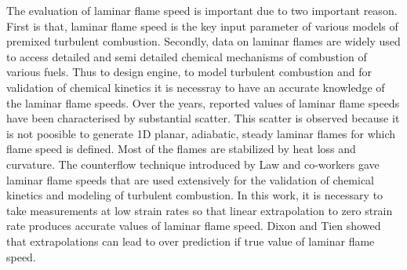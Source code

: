 The evaluation of laminar flame speed is important due to two important reason. First is that, laminar flame speed is the key input parameter of various models of premixed turbulent combustion. Secondly, data on laminar flames are widely used to access detailed and semi detailed chemical mechanisms of combustion of various fuels. Thus to design engine, to model turbulent combustion and for validation of chemical kinetics it is necessray to have an accurate knowledge of the laminar flame speeds. Over the years, reported values of laminar flame speeds have been characterised by substantial scatter\cite{Andrews}. This scatter is observed because it is not poosible to generate 1D planar, adiabatic, steady laminar flames for which flame speed is defined. Most of the flames are stabilized by heat loss and curvature. The counterflow technique introduced by  Law and co-workers\cite{law} gave laminar flame speeds that are used extensively for the validation of chemical kinetics and modeling of turbulent combustion. In this work, it is necessary to take measurements at low strain rates so that linear extrapolation to zero strain rate produces accurate values of laminar flame speed. Dixon \cite{dixon} and Tien\cite{tien} showed that extrapolations can lead to over prediction if true value of laminar flame speed.  

